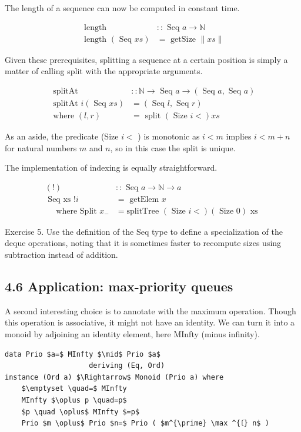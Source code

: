 \documentclass[10pt]{article}
\begin{document}
The length of a sequence can now be computed in constant time.

$$
\begin{array}{ll}
\text { length } & :: \text { Seq } a \rightarrow \mathbb{N} \\
\text { length }(\text { Seq } x s) & =\text { getSize }\|x s\|
\end{array}
$$

Given these prerequisites, splitting a sequence at a certain position is simply a matter of calling split with the appropriate arguments.

$$
\begin{aligned}
\text { splitAt } & :: \mathbb{N} \rightarrow \text { Seq } a \rightarrow(\text { Seq } a, \text { Seq } a) \\
\text { splitAt } i(\text { Seq } x s) & =(\text { Seq } l, \text { Seq } r) \\
\text { where }(l, r) & =\text { split }(\text { Size } i<) x s
\end{aligned}
$$

As an aside, the predicate (Size $i<$ ) is monotonic as $i<m$ implies $i<m+n$ for natural numbers $m$ and $n$, so in this case the split is unique.

The implementation of indexing is equally straightforward.

$$
\begin{array}{ll}
(!) & :: \text { Seq } a \rightarrow \mathbb{N} \rightarrow a \\
\text { Seq xs }!i & =\text { getElem } x \\
\quad \text { where Split } x_{-} & =\text {splitTree }(\text { Size } i<)(\text { Size } 0) \text { xs }
\end{array}
$$

Exercise 5. Use the definition of the Seq type to define a specialization of the deque operations, noting that it is sometimes faster to recompute sizes using subtraction instead of addition.

\subsection*{4.6 Application: max-priority queues}
A second interesting choice is to annotate with the maximum operation. Though this operation is associative, it might not have an identity. We can turn it into a monoid by adjoining an identity element, here MInfty (minus infinity).

\begin{verbatim}
data Prio $a=$ MInfty $\mid$ Prio $a$
                    deriving (Eq, Ord)
instance (Ord a) $\Rightarrow$ Monoid (Prio a) where
    $\emptyset \quad=$ MInfty
    MInfty $\oplus p \quad=p$
    $p \quad \oplus$ MInfty $=p$
    Prio $m \oplus$ Prio $n=$ Prio ( $m^{\prime} \max ^{〔} n$ )
\end{verbatim}
\end{document}
